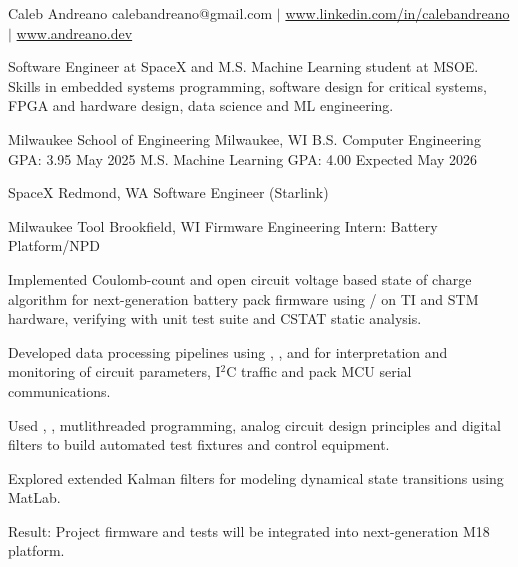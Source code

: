 \documentclass[11pt]{article}
\begin{document}

\namestuff 
{Caleb Andreano}
{calebandreano@gmail.com $|$ \url{www.linkedin.com/in/calebandreano} $|$ \url{www.andreano.dev}}

\rootstart{}
Software Engineer at SpaceX and M.S. Machine Learning student at MSOE.
Skills in embedded systems programming, software design for critical systems, FPGA and hardware design, data science and ML engineering.

\rootend


\sectiongpa
{Milwaukee School of Engineering} {Milwaukee, WI}
{B.S. Computer Engineering} {GPA: 3.95} {May 2025}
{M.S. Machine Learning} {GPA: 4.00} {Expected May 2026}

\rootend


\sectionloc
{SpaceX} {Redmond, WA}
{Software Engineer (Starlink)} {}
{}

\sectionloc
{Milwaukee Tool} {Brookfield, WI}
{Firmware Engineering Intern: Battery Platform/NPD} {}
{\begin{circlist}
	\item Implemented Coulomb-count and open circuit voltage based state of charge algorithm for next-generation battery pack firmware using / on TI and STM hardware, verifying with unit test suite and CSTAT static analysis.
	\item Developed data processing pipelines using , ,  and  for interpretation and monitoring of circuit parameters, I$^2$C traffic and pack MCU serial communications.
	\item Used , , mutlithreaded programming, analog circuit design principles and digital filters to build automated test fixtures and control equipment.
	\item Explored extended Kalman filters for modeling dynamical state transitions using MatLab.
	\item Result: Project firmware and tests will be integrated into next-generation M18 platform.
\end{circlist}}
\end{document}
